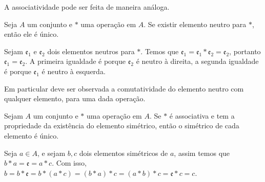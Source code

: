 \documentclass[../main.tex]{subfiles}
\begin{document}
A associatividade pode ser feita de maneira análoga.

\begin{teo}\label{agb-neutro-unico}
    Seja $A$ um conjunto e $*$ uma operação em $A$. Se existir elemento neutro para $*$, então ele é único.
\end{teo}
\begin{dem}
    Sejam $\mathfrak{e_1}$ e $\mathfrak{e_2}$ dois elementos neutros para $*$. Temos que ${\mathfrak{e_1} = \mathfrak{e_1} * \mathfrak{e_2} = \mathfrak{e_2}}$, portanto ${\mathfrak{e_1} = \mathfrak{e_2}}$. A primeira igualdade é porque $\mathfrak{e_2}$ é neutro à direita, a segunda igualdade é porque $\mathfrak{e_1}$ é neutro à esquerda.
\end{dem}

Em particular deve ser observada a comutatividade do elemento neutro com qualquer elemento, para uma dada operação.

\begin{teo}\label{agb-teo-simetricoUnico}
    Sejam $A$ um conjunto e $*$ uma operação em $A$. Se $*$ é associativa e tem a propriedade da existência do elemento simétrico, então o simétrico de cada elemento é único.
\end{teo}
\begin{dem}
    Seja $a \in A$, e sejam $b, c$ dois elementos simétricos de $a$, assim temos que $b*a = \mathfrak{e} = a*c$. 
    Com isso, $b = b * \mathfrak{e} = b * (a * c) = (b * a) * c = ( a * b ) * c = \mathfrak{e} * c = c$.
\end{dem}
\end{document}
